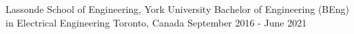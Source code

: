


\begin{cventries}


\cventry
{Lassonde School of Engineering, York University} %
{Bachelor of Engineering (BEng) in Electrical Engineering} %
{Toronto, Canada} %
{September 2016 - June 2021} %
{ %
\begin{cvitems}
\end{cvitems}
}


\end{cventries}